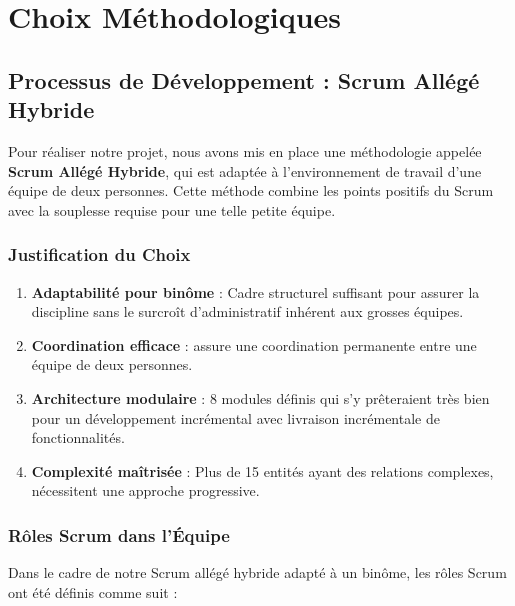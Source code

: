 \documentclass[12pt,a4paper]{report}
\begin{document}
\section{Choix Méthodologiques}

\subsection{Processus de Développement : Scrum Allégé Hybride}

Pour réaliser notre projet, nous avons mis en place une méthodologie appelée \textbf{Scrum Allégé Hybride}, qui est adaptée à l'environnement de travail d'une équipe de deux personnes. Cette méthode combine les points positifs du Scrum avec la souplesse requise pour une telle petite équipe.

\subsubsection{Justification du Choix}

\begin{enumerate}[itemsep=0.5em]
    \item \textbf{Adaptabilité pour binôme} : Cadre structurel suffisant pour assurer la discipline sans le surcroît d'administratif inhérent aux grosses équipes.
    \item \textbf{Coordination efficace} : assure une coordination permanente entre une équipe de deux personnes.
    \item \textbf{Architecture modulaire} : 8 modules définis qui s'y prêteraient très bien pour un développement incrémental avec livraison incrémentale de fonctionnalités.
    \item \textbf{Complexité maîtrisée} : Plus de 15 entités ayant des relations complexes, nécessitent une approche progressive.
\end{enumerate}

\subsubsection{Rôles Scrum dans l'Équipe}

Dans le cadre de notre Scrum allégé hybride adapté à un binôme, les rôles Scrum ont été définis comme suit :
\end{document}
